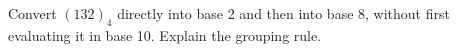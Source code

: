 Convert $(132)_4$ directly into base 2 and then into base 8, without first evaluating it in base 10. Explain the grouping rule.
